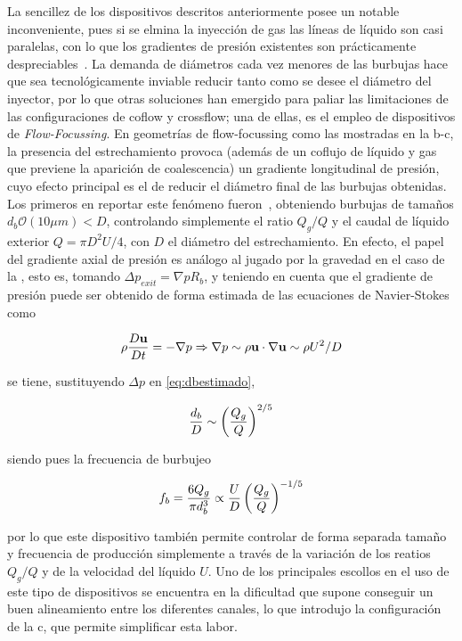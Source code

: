 La sencillez de los dispositivos descritos anteriormente posee un notable inconveniente, pues si se elmina la inyección de gas las líneas de líquido son casi paralelas, con lo que los gradientes de presión existentes son prácticamente despreciables~\cite{Rodriguez-Rodriguez2015b}. La demanda de diámetros cada vez menores de las burbujas hace que sea tecnológicamente inviable reducir tanto como se desee el diámetro del inyector, por lo que otras soluciones han emergido para paliar las limitaciones de las configuraciones de coflow y crossflow; una de ellas, es el empleo de dispositivos de \emph{Flow-Focussing}. En geometrías de flow-focussing como las mostradas en la b-c, la presencia del estrechamiento provoca (además de un coflujo de líquido y gas que previene la aparición de coalescencia) un gradiente longitudinal de presión, cuyo efecto principal es el de reducir el diámetro final de las burbujas obtenidas. Los primeros en reportar este fenómeno fueron~\cite{Ganan-Calvo2001a}, obteniendo burbujas de tamaños $d_{b} \mathcal{O}\left(10 \mu m\right) < D$, controlando simplemente el ratio $Q_{g}/Q$  y el caudal de líquido exterior $Q = \pi D^{2} U/4$, con $D$ el diámetro del estrechamiento. En efecto, el papel del gradiente axial de presión es análogo al jugado por la gravedad en el caso de la , esto es, tomando $\Delta p_{exit} = \nabla p R_{b}$, y teniendo en cuenta que el gradiente de presión puede ser obtenido de forma estimada de las ecuaciones de Navier-Stokes como

\begin{equation}\LABEQ{focusGradPres}
\rho \dfrac{D\mathbf{u}}{Dt} = -\nabla p \Rightarrow \nabla p \sim \rho \mathbf{u} \cdot \nabla \mathbf{u} \sim \rho U^{2}/D
\end{equation}

se tiene, sustituyendo $ \Delta p $ en \eqref{eq:dbestimado},

\begin{equation}\LABEQ{focusDbEstimado}
\dfrac{d_{b}}{D} \sim \left(\dfrac{Q_{g}}{Q}\right)^{2/5}
\end{equation}

siendo pues la frecuencia de burbujeo 

\begin{equation}\LABEQ{focusFb}
f_{b} = \dfrac{6 Q_{g}}{\pi d_{b}^{3}} \propto \dfrac{U}{D}\left(\dfrac{Q_{g}}{Q}\right)^{-1/5}
\end{equation}

por lo que este dispositivo también permite controlar de forma separada tamaño y frecuencia de producción simplemente a través de la variación de los reatios $Q_{g}/Q$ y de la velocidad del líquido $U$. Uno de los principales escollos en el uso de este tipo de dispositivos se encuentra en la dificultad que supone conseguir un buen alineamiento entre los diferentes canales, lo que introdujo la configuración de la c, que permite simplificar esta labor.


